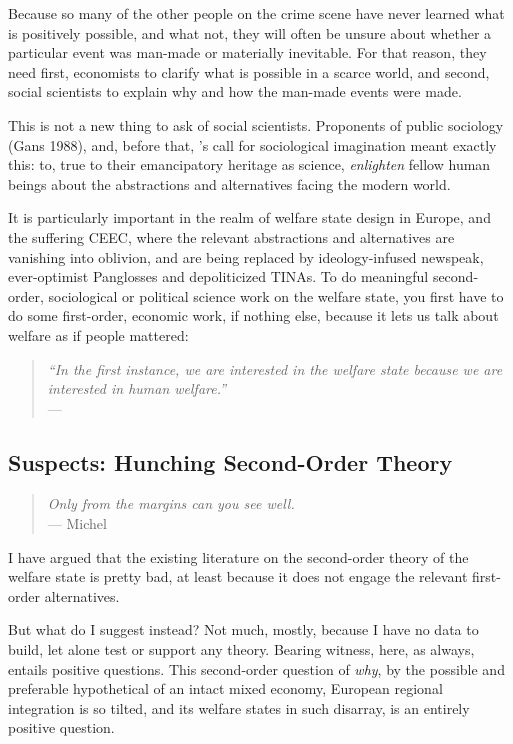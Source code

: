 \documentclass[11pt,a4paper,oneside]{article}
\begin{document}
Because so many of the other people on the crime scene have never learned what is positively possible, and what not, they will often be unsure about whether a particular event was man-made or materially inevitable. 
For that reason, they need first, economists to clarify what is possible in a scarce world, and second, social scientists to explain why and how the man-made events were made.

This is not a new thing to ask of social scientists. 
Proponents of public sociology (Gans 1988), and, before that, \citeauthor{Mills-1959-aa}'s call for sociological imagination meant exactly this: 
to, true to their emancipatory heritage as science, \emph{enlighten} fellow human beings about the abstractions and alternatives facing the modern world.

It is particularly important in the realm of welfare state design in Europe, and the suffering \gls{CEEC}, where the relevant abstractions and alternatives are vanishing into oblivion, and are being replaced by ideology-infused newspeak, ever-optimist Panglosses and depoliticized TINAs. 
To do meaningful second-order, sociological or political science work on the welfare state, you first have to do some first-order, economic work, if nothing else, because it lets us talk about welfare as if people mattered:
\begin{quote}
	\emph{``In the first instance, we are interested in the welfare state because we are interested in human welfare.''}\\
	--- \cite[236]{Haggard2009}
\end{quote}

\subsection[Suspects]{Suspects: Hunching Second-Order Theory}

\begin{quote}
	\emph{Only from the margins can you see well.}\\
	--- Michel \cite{Foucault-1972-aa} 
\end{quote}

I have argued that the existing literature on the second-order theory of the welfare state is pretty bad, at least because it does not engage the relevant first-order alternatives. 

But what do I suggest instead? 
Not much, mostly, because I have no data to build, let alone test or support any theory. 
Bearing witness, here, as always, entails positive questions. 
This second-order question of \emph{why}, by the possible and preferable hypothetical of an intact mixed economy, European regional integration is so tilted, and its welfare states in such disarray, is an entirely positive question.
\end{document}
